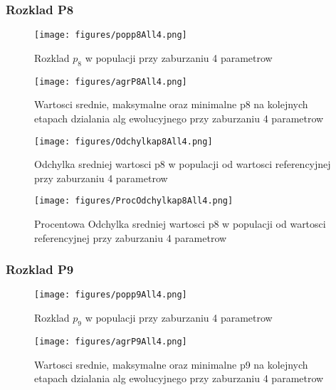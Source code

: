 \documentclass[]{article}
\begin{document}
\newpage

\subsubsection{Rozklad P8}\label{rozklad-p8}

\begin{figure}[htbp]
\centering
\texttt{[image: figures/popp8All4.png]}
\caption{Rozklad \(p_8\) w populacji przy zaburzaniu 4 parametrow}
\end{figure}

\begin{figure}[htbp]
\centering
\texttt{[image: figures/agrP8All4.png]}
\caption{Wartosci srednie, maksymalne oraz minimalne p8 na kolejnych
etapach dzialania alg ewolucyjnego przy zaburzaniu 4 parametrow}
\end{figure}

\begin{figure}[htbp]
\centering
\texttt{[image: figures/Odchylkap8All4.png]}
\caption{Odchylka sredniej wartosci p8 w populacji od wartosci
referencyjnej przy zaburzaniu 4 parametrow}
\end{figure}

\begin{figure}[htbp]
\centering
\texttt{[image: figures/ProcOdchylkap8All4.png]}
\caption{Procentowa Odchylka sredniej wartosci p8 w populacji od
wartosci referencyjnej przy zaburzaniu 4 parametrow}
\end{figure}

\newpage

\subsubsection{Rozklad P9}\label{rozklad-p9}

\begin{figure}[htbp]
\centering
\texttt{[image: figures/popp9All4.png]}
\caption{Rozklad \(p_9\) w populacji przy zaburzaniu 4 parametrow}
\end{figure}

\begin{figure}[htbp]
\centering
\texttt{[image: figures/agrP9All4.png]}
\caption{Wartosci srednie, maksymalne oraz minimalne p9 na kolejnych
etapach dzialania alg ewolucyjnego przy zaburzaniu 4 parametrow}
\end{figure}
\end{document}
